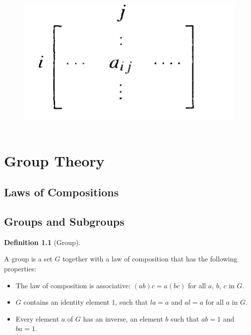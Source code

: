 \documentclass[
]{book}
\providecommand{\tightlist}{%
  \setlength{\itemsep}{0pt}\setlength{\parskip}{0pt}}
\theoremstyle{definition}
\newtheorem{definition}{Definition}[chapter]
\theoremstyle{definition}
\theoremstyle{definition}
\theoremstyle{definition}
\theoremstyle{remark}
\begin{document}
\begin{figure}
\centering
\includegraphics{figures/ch_1/fig02.png}
\caption{\label{fig:fig02}\(~\)}
\end{figure}

\hypertarget{group-theory}{%
\chapter{Group Theory}\label{group-theory}}

\hypertarget{laws-of-compositions}{%
\section{Laws of Compositions}\label{laws-of-compositions}}

\hypertarget{groups-and-subgroups}{%
\section{Groups and Subgroups}\label{groups-and-subgroups}}

\begin{definition}[Group]
\protect\hypertarget{def:unnamed-chunk-2}{}\label{def:unnamed-chunk-2}

A group is a set \(G\) together with a law of composition that has the following properties:

\begin{itemize}
\tightlist
\item
  The law of composition is associative: \((ab)c = a(bc)\) for all \(a\), \(b\), \(c\) in \(G\).
\item
  \(G\) contains an identity element \(1\), such that \(la = a\) and \(al = a\) for all \(a\) in \(G\).
\item
  Every element \(a\) of \(G\) has an inverse, an element \(b\) such that \(ab = 1\) and \(ba = 1\).
\end{itemize}

\end{definition}
\end{document}
